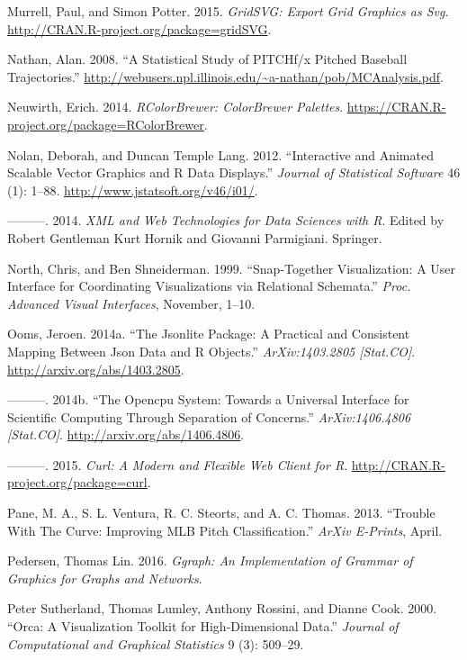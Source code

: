 \documentclass[12pt,]{isuthesis}
\begin{document}
\hypertarget{ref-gridSVG}{}
Murrell, Paul, and Simon Potter. 2015. \emph{GridSVG: Export Grid
Graphics as Svg}. \url{http://CRAN.R-project.org/package=gridSVG}.

\hypertarget{ref-trajecoryAnalysis}{}
Nathan, Alan. 2008. ``A Statistical Study of PITCHf/x Pitched Baseball
Trajectories.''
\url{http://webusers.npl.illinois.edu/~a-nathan/pob/MCAnalysis.pdf}.

\hypertarget{ref-RColorBrewer}{}
Neuwirth, Erich. 2014. \emph{RColorBrewer: ColorBrewer Palettes}.
\url{https://CRAN.R-project.org/package=RColorBrewer}.

\hypertarget{ref-SVGAnnotation}{}
Nolan, Deborah, and Duncan Temple Lang. 2012. ``Interactive and Animated
Scalable Vector Graphics and R Data Displays.'' \emph{Journal of
Statistical Software} 46 (1): 1--88.
\url{http://www.jstatsoft.org/v46/i01/}.

\hypertarget{ref-nolan-lang}{}
---------. 2014. \emph{XML and Web Technologies for Data Sciences with
R}. Edited by Robert Gentleman Kurt Hornik and Giovanni Parmigiani.
Springer.

\hypertarget{ref-North:1999vi}{}
North, Chris, and Ben Shneiderman. 1999. ``Snap-Together Visualization:
A User Interface for Coordinating Visualizations via Relational
Schemata.'' \emph{Proc. Advanced Visual Interfaces}, November, 1--10.

\hypertarget{ref-jsonlite}{}
Ooms, Jeroen. 2014a. ``The Jsonlite Package: A Practical and Consistent
Mapping Between Json Data and R Objects.'' \emph{ArXiv:1403.2805
{[}Stat.CO{]}}. \url{http://arxiv.org/abs/1403.2805}.

\hypertarget{ref-opencpu}{}
---------. 2014b. ``The Opencpu System: Towards a Universal Interface
for Scientific Computing Through Separation of Concerns.''
\emph{ArXiv:1406.4806 {[}Stat.CO{]}}.
\url{http://arxiv.org/abs/1406.4806}.

\hypertarget{ref-curl}{}
---------. 2015. \emph{Curl: A Modern and Flexible Web Client for R}.
\url{http://CRAN.R-project.org/package=curl}.

\hypertarget{ref-curve}{}
Pane, M. A., S. L. Ventura, R. C. Steorts, and A. C. Thomas. 2013.
``Trouble With The Curve: Improving MLB Pitch Classification.''
\emph{ArXiv E-Prints}, April.

\hypertarget{ref-ggraph}{}
Pedersen, Thomas Lin. 2016. \emph{Ggraph: An Implementation of Grammar
of Graphics for Graphs and Networks}.

\hypertarget{ref-orca}{}
Peter Sutherland, Thomas Lumley, Anthony Rossini, and Dianne Cook. 2000.
``Orca: A Visualization Toolkit for High-Dimensional Data.''
\emph{Journal of Computational and Graphical Statistics} 9 (3): 509--29.
\end{document}
